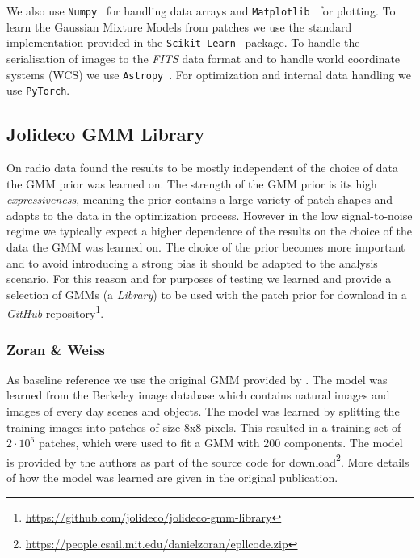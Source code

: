 \documentclass[twocolumn]{aastex631}
\begin{document}
    We also use \texttt{Numpy}~\citep{Numpy2020} for handling data arrays and \texttt{Matplotlib}~\citep{Hunter2007} for plotting. To learn the Gaussian Mixture Models from patches we use the standard implementation provided in the \texttt{Scikit-Learn}~\citep{Skimage2014} package. To handle the serialisation of images to the \textit{FITS} data format and to handle world coordinate systems (WCS) we use \texttt{Astropy}~\citep{Astropy2018}. For optimization and internal data handling we use \texttt{PyTorch}.

    \subsection{Jolideco GMM Library}
    \label{ssec:jolideco-gmm-library}
    On radio data \cite{Bouman2016} found the results to be mostly independent of the choice of data the GMM prior was learned on. The strength of the GMM prior is its high \textit{expressiveness}, meaning the prior contains a large variety of patch shapes and adapts to the data in the optimization process. However in the low signal-to-noise regime we typically expect a higher dependence of the results on the choice of the data the GMM was learned on. The choice of the prior becomes more important and to avoid introducing a strong bias it should be adapted to the analysis scenario. For this reason and for purposes of testing we learned and provide a selection of GMMs (a \textit{Library}) to be used with the patch prior for download in a \textit{GitHub} repository\footnote{\url{https://github.com/jolideco/jolideco-gmm-library}}.
    
    \subsubsection{Zoran \& Weiss}
    As baseline reference we use the original GMM provided by \cite{Zoran2011}. The model was learned from the Berkeley image database \citep{Martin2001} which contains natural images and images of every day scenes and objects. The model was learned by splitting the training images into patches of size 8x8 pixels. This resulted in a training set of $2 \cdot 10^{6}$ patches, which were used to fit a GMM with 200 components. The model is provided by the authors as part of the source code for download\footnote{\url{https://people.csail.mit.edu/danielzoran/epllcode.zip}}. More details of how the model was learned are given in the original publication.
    
\end{document}
